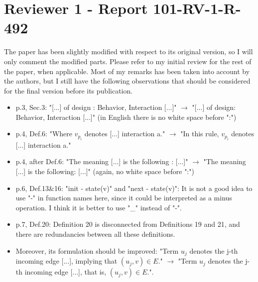 \section{Reviewer 1 - Report 101-RV-1-R-492}
The paper has been slightly modified with respect to its original version, so I
will only comment the modified parts.
Please refer to my initial review for the rest of the paper, when applicable.
Most of my remarks has been taken into account by the authors, but I still have
the following observations that should be considered for the final version
before its publication.

\begin{itemize}
\item p.3, Sec.3: "[...] of design : Behavior, Interaction [...]" $\rightarrow$ "[...] of
design: Behavior, Interaction [...]" (in English there is no white space before ":")

\item p.4, Def.6: "Where $v_{p_i}$ denotes [...] interaction a." $\rightarrow$ "In this rule,
$v_{p_i}$ denotes [...] interaction a."

\done

\item p.4, after Def.6: "The meaning [...] is the following : [...]" $\rightarrow$ "The meaning
[...] is the following: [...]" (again, no white space before ":")

\done


\item p.6, Def.13\&16: "init - state(v)" and "next - state(v)": It is not a good idea
to use "-" in function names here, since it could be interpreted as a minus
operation. I think it is better to use "\_" instead of "-".


\item p.7, Def.20: Definition 20 is disconnected from Definitions 19 and 21, and
there are redundancies between all these definitions.


\item Moreover, its formulation should be improved: "Term $u_j$ denotes the j-th
incoming edge [...], implying that $(u_j,v) \in E$." $\rightarrow$ "Term $u_j$ denotes the j-th
incoming edge [...], that is, $(u_j,v) \in E$.".
\done


\end{itemize}
